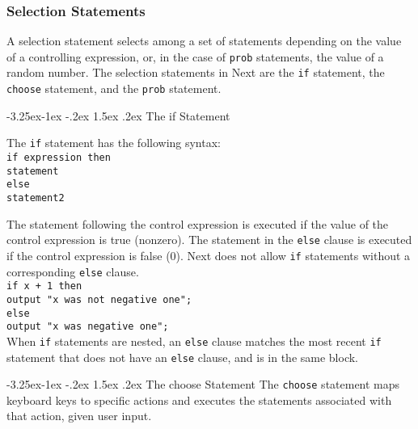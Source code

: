\documentclass[12pt]{article}
\makeatletter
\renewcommand\paragraph{\@startsection{paragraph}{4}{\z@}%
  {-3.25ex\@plus -1ex \@minus -.2ex}%
  {1.5ex \@plus .2ex}%
  {\normalfont\normalsize\bfseries}}
\makeatother
\begin{document}
\subsubsection{Selection Statements}
A selection statement selects among a set of statements depending on the value of a controlling expression, or, in the case of \texttt{prob} statements, the value of a random number.  The selection statements in Next are the \texttt{if} statement, the \texttt{choose} statement, and the \texttt{prob} statement.

\paragraph{The if Statement}

The \texttt{if} statement has the following syntax: \\

\texttt{if expression then \\
\indent \indent statement \\
\indent else \\
\indent \indent statement2 \\
}

\noindent The statement following the control expression is executed if the value of the control expression is true (nonzero).  The statement in the \texttt{else} clause is executed if the control expression is false (0).  Next does not allow \texttt{if} statements without a corresponding \texttt{else} clause.  \\

\texttt{if x + 1 then \\
\indent \indent output "x was not negative one";} \\
\indent \texttt{else \\
\indent \indent output "x was negative one";} \\

\noindent When \texttt{if} statements are nested, an \texttt{else} clause matches the most recent \texttt{if} statement that does not have an \texttt{else} clause, and is in the same block.

\paragraph{The choose Statement}
The \texttt{choose} statement maps keyboard keys to specific actions and executes the statements associated with that action, given user input. \\
\end{document}
